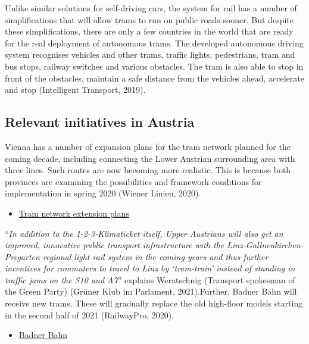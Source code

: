\documentclass[
]{book}
\providecommand{\tightlist}{%
  \setlength{\itemsep}{0pt}\setlength{\parskip}{0pt}}
\begin{document}
Unlike similar solutions for self-driving cars, the system for rail has a number of simplifications that will allow trams to run on public roads sooner. But despite these simplifications, there are only a few countries in the world that are ready for the real deployment of autonomous trams. The developed autonomous driving system recognises vehicles and other trams, traffic lights, pedestrians, tram and bus stops, railway switches and various obstacles. The tram is also able to stop in front of the obstacles, maintain a safe distance from the vehicles ahead, accelerate and stop (Intelligent Transport, 2019).

\hypertarget{relevant-initiatives-in-austria-38}{%
\subsection*{Relevant initiatives in Austria}\label{relevant-initiatives-in-austria-38}}

Vienna has a number of expansion plans for the tram network planned for the coming decade, including connecting the Lower Austrian surrounding area with three lines. Such routes are now becoming more realistic. This is because both provinces are examining the possibilities and framework conditions for implementation in spring 2020 (Wiener Linien, 2020).

\begin{itemize}
\tightlist
\item
  \href{https://wien.orf.at/stories/3068577/}{Tram network extension plans}
\end{itemize}

``\emph{In addition to the 1-2-3-Klimaticket itself, Upper Austrians will also get an improved, innovative public transport infrastructure with the Linz-Gallneukirchen-Pregarten regional light rail system in the coming years and thus further incentives for commuters to travel to Linz by `tram-train' instead of standing in traffic jams on the S10 and A7}'' explains Weratschnig (Transport spokesman of the Green Party) (Grüner Klub im Parlament, 2021).Further, Badner Bahn will receive new trams. These will gradually replace the old high-floor models starting in the second half of 2021 (RailwayPro, 2020).

\begin{itemize}
\tightlist
\item
  \href{https://www.railwaypro.com/wp/interior-design-for-wiener-lokalbahnen-new-tram-unveiled/}{Badner Bahn}
\end{itemize}
\end{document}
